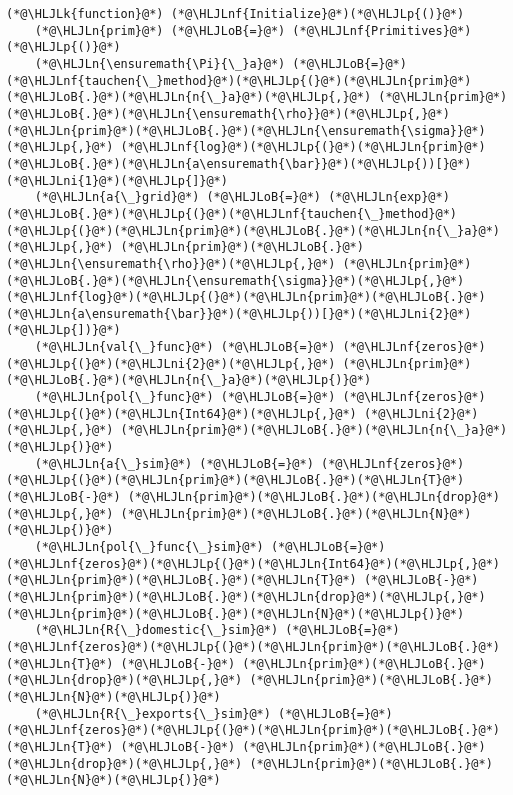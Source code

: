 \documentclass[12pt,a4paper]{article}
\newcommand{\HLJLk}[1]{\textcolor[RGB]{148,91,176}{\textbf{#1}}}
\newcommand{\HLJLn}[1]{#1}
\newcommand{\HLJLnf}[1]{\textcolor[RGB]{66,102,213}{#1}}
\newcommand{\HLJLni}[1]{\textcolor[RGB]{59,151,46}{#1}}
\newcommand{\HLJLoB}[1]{\textcolor[RGB]{102,102,102}{\textbf{#1}}}
\newcommand{\HLJLp}[1]{#1}
\begin{document}
\begin{lstlisting}
(*@\HLJLk{function}@*) (*@\HLJLnf{Initialize}@*)(*@\HLJLp{()}@*)
    (*@\HLJLn{prim}@*) (*@\HLJLoB{=}@*) (*@\HLJLnf{Primitives}@*)(*@\HLJLp{()}@*)
    (*@\HLJLn{\ensuremath{\Pi}{\_}a}@*) (*@\HLJLoB{=}@*) (*@\HLJLnf{tauchen{\_}method}@*)(*@\HLJLp{(}@*)(*@\HLJLn{prim}@*)(*@\HLJLoB{.}@*)(*@\HLJLn{n{\_}a}@*)(*@\HLJLp{,}@*) (*@\HLJLn{prim}@*)(*@\HLJLoB{.}@*)(*@\HLJLn{\ensuremath{\rho}}@*)(*@\HLJLp{,}@*) (*@\HLJLn{prim}@*)(*@\HLJLoB{.}@*)(*@\HLJLn{\ensuremath{\sigma}}@*)(*@\HLJLp{,}@*) (*@\HLJLnf{log}@*)(*@\HLJLp{(}@*)(*@\HLJLn{prim}@*)(*@\HLJLoB{.}@*)(*@\HLJLn{a\ensuremath{\bar}}@*)(*@\HLJLp{))[}@*)(*@\HLJLni{1}@*)(*@\HLJLp{]}@*)
    (*@\HLJLn{a{\_}grid}@*) (*@\HLJLoB{=}@*) (*@\HLJLn{exp}@*)(*@\HLJLoB{.}@*)(*@\HLJLp{(}@*)(*@\HLJLnf{tauchen{\_}method}@*)(*@\HLJLp{(}@*)(*@\HLJLn{prim}@*)(*@\HLJLoB{.}@*)(*@\HLJLn{n{\_}a}@*)(*@\HLJLp{,}@*) (*@\HLJLn{prim}@*)(*@\HLJLoB{.}@*)(*@\HLJLn{\ensuremath{\rho}}@*)(*@\HLJLp{,}@*) (*@\HLJLn{prim}@*)(*@\HLJLoB{.}@*)(*@\HLJLn{\ensuremath{\sigma}}@*)(*@\HLJLp{,}@*) (*@\HLJLnf{log}@*)(*@\HLJLp{(}@*)(*@\HLJLn{prim}@*)(*@\HLJLoB{.}@*)(*@\HLJLn{a\ensuremath{\bar}}@*)(*@\HLJLp{))[}@*)(*@\HLJLni{2}@*)(*@\HLJLp{])}@*)
    (*@\HLJLn{val{\_}func}@*) (*@\HLJLoB{=}@*) (*@\HLJLnf{zeros}@*)(*@\HLJLp{(}@*)(*@\HLJLni{2}@*)(*@\HLJLp{,}@*) (*@\HLJLn{prim}@*)(*@\HLJLoB{.}@*)(*@\HLJLn{n{\_}a}@*)(*@\HLJLp{)}@*)
    (*@\HLJLn{pol{\_}func}@*) (*@\HLJLoB{=}@*) (*@\HLJLnf{zeros}@*)(*@\HLJLp{(}@*)(*@\HLJLn{Int64}@*)(*@\HLJLp{,}@*) (*@\HLJLni{2}@*)(*@\HLJLp{,}@*) (*@\HLJLn{prim}@*)(*@\HLJLoB{.}@*)(*@\HLJLn{n{\_}a}@*)(*@\HLJLp{)}@*)
    (*@\HLJLn{a{\_}sim}@*) (*@\HLJLoB{=}@*) (*@\HLJLnf{zeros}@*)(*@\HLJLp{(}@*)(*@\HLJLn{prim}@*)(*@\HLJLoB{.}@*)(*@\HLJLn{T}@*) (*@\HLJLoB{-}@*) (*@\HLJLn{prim}@*)(*@\HLJLoB{.}@*)(*@\HLJLn{drop}@*)(*@\HLJLp{,}@*) (*@\HLJLn{prim}@*)(*@\HLJLoB{.}@*)(*@\HLJLn{N}@*)(*@\HLJLp{)}@*)
    (*@\HLJLn{pol{\_}func{\_}sim}@*) (*@\HLJLoB{=}@*) (*@\HLJLnf{zeros}@*)(*@\HLJLp{(}@*)(*@\HLJLn{Int64}@*)(*@\HLJLp{,}@*) (*@\HLJLn{prim}@*)(*@\HLJLoB{.}@*)(*@\HLJLn{T}@*) (*@\HLJLoB{-}@*) (*@\HLJLn{prim}@*)(*@\HLJLoB{.}@*)(*@\HLJLn{drop}@*)(*@\HLJLp{,}@*) (*@\HLJLn{prim}@*)(*@\HLJLoB{.}@*)(*@\HLJLn{N}@*)(*@\HLJLp{)}@*)
    (*@\HLJLn{R{\_}domestic{\_}sim}@*) (*@\HLJLoB{=}@*) (*@\HLJLnf{zeros}@*)(*@\HLJLp{(}@*)(*@\HLJLn{prim}@*)(*@\HLJLoB{.}@*)(*@\HLJLn{T}@*) (*@\HLJLoB{-}@*) (*@\HLJLn{prim}@*)(*@\HLJLoB{.}@*)(*@\HLJLn{drop}@*)(*@\HLJLp{,}@*) (*@\HLJLn{prim}@*)(*@\HLJLoB{.}@*)(*@\HLJLn{N}@*)(*@\HLJLp{)}@*)
    (*@\HLJLn{R{\_}exports{\_}sim}@*) (*@\HLJLoB{=}@*) (*@\HLJLnf{zeros}@*)(*@\HLJLp{(}@*)(*@\HLJLn{prim}@*)(*@\HLJLoB{.}@*)(*@\HLJLn{T}@*) (*@\HLJLoB{-}@*) (*@\HLJLn{prim}@*)(*@\HLJLoB{.}@*)(*@\HLJLn{drop}@*)(*@\HLJLp{,}@*) (*@\HLJLn{prim}@*)(*@\HLJLoB{.}@*)(*@\HLJLn{N}@*)(*@\HLJLp{)}@*)

\end{lstlisting}
\end{document}
